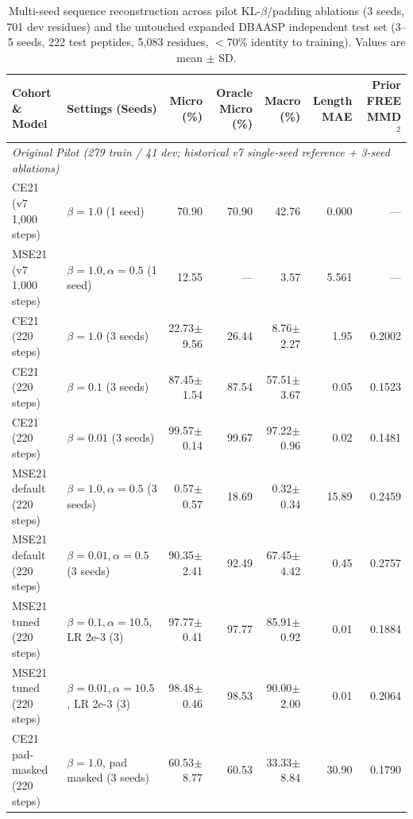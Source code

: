 \documentclass[unnumsec,webpdf,contemporary,large]{oup-authoring-template}
\newcommand{\rev}[1]{#1}
\begin{document}
\begin{table}[t]
\caption{\rev{Multi-seed sequence reconstruction across pilot KL-$\beta$/padding ablations (3 seeds, 701 dev residues) and the untouched expanded DBAASP independent test set (3--5 seeds, 222 test peptides, 5,083 residues, $<$70\% identity to training). Values are mean $\pm$ SD.}}
\label{tab:reconstruction}
\centering
\footnotesize
\begin{tabular}{llrrrrr}
\toprule
\rev{Cohort \& Model} & \rev{Settings (Seeds)} & \rev{Micro (\%)} & \rev{Oracle Micro (\%)} & \rev{Macro (\%)} & \rev{Length MAE} & \rev{Prior FREE MMD$^2$} \\
\midrule
\multicolumn{7}{l}{\textit{\rev{Original Pilot (279 train / 41 dev; historical v7 single-seed reference + 3-seed ablations)}}} \\
CE21 (v7 1,000 steps) & $\beta=1.0$ (1 seed) & 70.90 & 70.90 & 42.76 & 0.000 & --- \\
MSE21 (v7 1,000 steps) & $\beta=1.0, \alpha=0.5$ (1 seed) & 12.55 & --- & 3.57 & 5.561 & --- \\
\rev{CE21 (220 steps)} & \rev{$\beta=1.0$ (3 seeds)} & \rev{22.73$\pm$9.56} & \rev{26.44} & \rev{8.76$\pm$2.27} & \rev{1.95} & \rev{0.2002} \\
\rev{CE21 (220 steps)} & \rev{$\beta=0.1$ (3 seeds)} & \rev{87.45$\pm$1.54} & \rev{87.54} & \rev{57.51$\pm$3.67} & \rev{0.05} & \rev{0.1523} \\
\rev{CE21 (220 steps)} & \rev{$\beta=0.01$ (3 seeds)} & \rev{99.57$\pm$0.14} & \rev{99.67} & \rev{97.22$\pm$0.96} & \rev{0.02} & \rev{0.1481} \\
\rev{MSE21 default (220 steps)} & \rev{$\beta=1.0, \alpha=0.5$ (3 seeds)} & \rev{0.57$\pm$0.57} & \rev{18.69} & \rev{0.32$\pm$0.34} & \rev{15.89} & \rev{0.2459} \\
\rev{MSE21 default (220 steps)} & \rev{$\beta=0.01, \alpha=0.5$ (3 seeds)} & \rev{90.35$\pm$2.41} & \rev{92.49} & \rev{67.45$\pm$4.42} & \rev{0.45} & \rev{0.2757} \\
\rev{MSE21 tuned (220 steps)} & \rev{$\beta=0.1, \alpha=10.5$, LR 2e-3 (3)} & \rev{97.77$\pm$0.41} & \rev{97.77} & \rev{85.91$\pm$0.92} & \rev{0.01} & \rev{0.1884} \\
\rev{MSE21 tuned (220 steps)} & \rev{$\beta=0.01, \alpha=10.5$, LR 2e-3 (3)} & \rev{98.48$\pm$0.46} & \rev{98.53} & \rev{90.00$\pm$2.00} & \rev{0.01} & \rev{0.2064} \\
\rev{CE21 pad-masked (220 steps)} & \rev{$\beta=1.0$, pad masked (3 seeds)} & \rev{60.53$\pm$8.77} & \rev{60.53} & \rev{33.33$\pm$8.84} & \rev{30.90} & \rev{0.1790} \\

\end{tabular}
\end{table}
\end{document}
